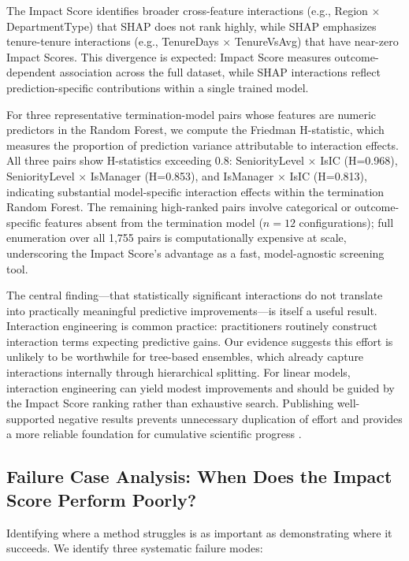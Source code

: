 \documentclass[conference]{IEEEtran}
\begin{document}
The Impact Score identifies broader cross-feature interactions (e.g., Region $\times$ DepartmentType) that SHAP does not rank highly, while SHAP emphasizes tenure-tenure interactions (e.g., TenureDays $\times$ TenureVsAvg) that have near-zero Impact Scores. This divergence is expected: Impact Score measures outcome-dependent association across the full dataset, while SHAP interactions reflect prediction-specific contributions within a single trained model.

For three representative termination-model pairs whose features are numeric predictors in the Random Forest, we compute the Friedman H-statistic, which measures the proportion of prediction variance attributable to interaction effects. All three pairs show H-statistics exceeding 0.8: SeniorityLevel $\times$ IsIC (H=0.968), SeniorityLevel $\times$ IsManager (H=0.853), and IsManager $\times$ IsIC (H=0.813), indicating substantial model-specific interaction effects within the termination Random Forest. The remaining high-ranked pairs involve categorical or outcome-specific features absent from the termination model ($n = 12$ configurations); full enumeration over all 1,755 pairs is computationally expensive at scale, underscoring the Impact Score's advantage as a fast, model-agnostic screening tool.

The central finding---that statistically significant interactions do not translate into practically meaningful predictive improvements---is itself a useful result. Interaction engineering is common practice: practitioners routinely construct interaction terms expecting predictive gains. Our evidence suggests this effort is unlikely to be worthwhile for tree-based ensembles, which already capture interactions internally through hierarchical splitting. For linear models, interaction engineering can yield modest improvements and should be guided by the Impact Score ranking rather than exhaustive search. Publishing well-supported negative results prevents unnecessary duplication of effort and provides a more reliable foundation for cumulative scientific progress \cite{karl2024embracing}.

\subsection{Failure Case Analysis: When Does the Impact Score Perform Poorly?}

Identifying where a method struggles is as important as demonstrating where it succeeds. We identify three systematic failure modes:
\end{document}
